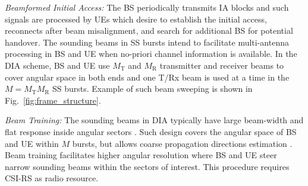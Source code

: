 \documentclass[journal]{IEEEtran}
\newcommand{\tx}[0]{\text{T}}
\newcommand{\rx}[0]{\text{R}}
\begin{document}
\textit{Beamformed Initial Access:}
The BS periodically transmits IA blocks and such signals are processed by UEs which desire to establish the initial access, reconnects after beam misalignment, and search for additional BS for potential handover. The sounding beams in SS bursts intend to facilitate multi-antenna processing in BS and UE when no-priori channel information is available. In the DIA scheme, BS and UE use $M_{\tx}$ and $M_{\rx}$ transmitter and receiver beams to cover angular space in both ends and one T/Rx beam is used at a time in the $M=M_{\tx}M_{\rx}$ SS bursts. Example of such beam sweeping is shown in Fig.~\ref{fig:frame_structure}.



\textit{Beam Training:} 
The sounding beams in DIA typically have large beam-width and flat response inside angular sectors \cite{7845674}. Such design covers the angular space of BS and UE within $M$ bursts, but allows coarse propagation directions estimation \cite{Caire_DIA_arxiv_1709}. Beam training facilitates higher angular resolution where BS and UE steer narrow sounding beams within the sectors of interest. This procedure requires CSI-RS as radio resource.



\end{document}
